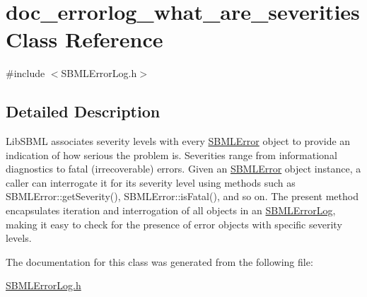 \hypertarget{classdoc__errorlog__what__are__severities}{}\section{doc\+\_\+errorlog\+\_\+what\+\_\+are\+\_\+severities Class Reference}
\label{classdoc__errorlog__what__are__severities}


{\ttfamily \#include $<$S\+B\+M\+L\+Error\+Log.\+h$>$}



\subsection{Detailed Description}
\begin{DoxyParagraph}{}
Lib\+S\+B\+ML associates severity levels with every \hyperlink{class_s_b_m_l_error}{S\+B\+M\+L\+Error} object to provide an indication of how serious the problem is. Severities range from informational diagnostics to fatal (irrecoverable) errors. Given an \hyperlink{class_s_b_m_l_error}{S\+B\+M\+L\+Error} object instance, a caller can interrogate it for its severity level using methods such as S\+B\+M\+L\+Error\+::get\+Severity(), S\+B\+M\+L\+Error\+::is\+Fatal(), and so on. The present method encapsulates iteration and interrogation of all objects in an \hyperlink{class_s_b_m_l_error_log}{S\+B\+M\+L\+Error\+Log}, making it easy to check for the presence of error objects with specific severity levels. 
\end{DoxyParagraph}


The documentation for this class was generated from the following file\+:\begin{DoxyCompactItemize}
\item 
\hyperlink{_s_b_m_l_error_log_8h}{S\+B\+M\+L\+Error\+Log.\+h}\end{DoxyCompactItemize}
